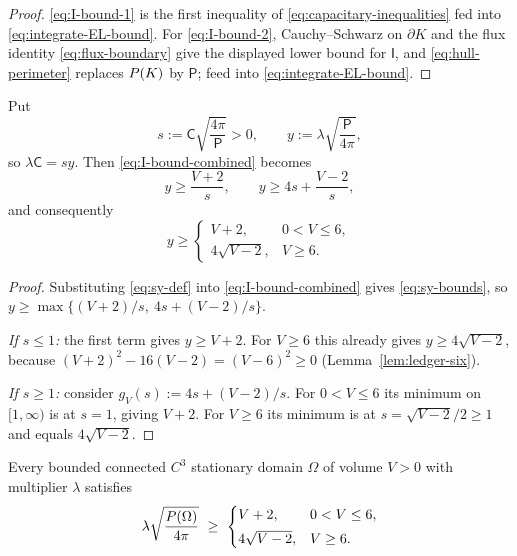 \begin{proof}
\eqref{eq:I-bound-1} is the first inequality of
\eqref{eq:capacitary-inequalities} fed into
\eqref{eq:integrate-EL-bound}.  For \eqref{eq:I-bound-2}, Cauchy--Schwarz on
$\partial K$ and the flux identity \eqref{eq:flux-boundary} give the displayed
lower bound for $\mathsf I$, and \eqref{eq:hull-perimeter} replaces $P(K)$
by $\mathsf P$; feed into \eqref{eq:integrate-EL-bound}.
\end{proof}

\begin{lemma}\label{lem:eliminate-capacity}
Put
\begin{equation}\label{eq:sy-def}
  s:=\mathsf C\sqrt{\frac{4\pi}{\mathsf P}}>0,
  \qquad
  y:=\lambda\sqrt{\frac{\mathsf P}{4\pi}},
\end{equation}
so $\lambda\mathsf C=sy$.  Then \eqref{eq:I-bound-combined} becomes
\begin{equation}\label{eq:sy-bounds}
  y\ge\frac{V+2}{s},
  \qquad
  y\ge4s+\frac{V-2}{s},
\end{equation}
and consequently
\begin{equation}\label{eq:y-lower}
  y\ge\begin{cases}V+2,&0<V\le6,\\[1mm]4\sqrt{V-2},&V\ge6 .\end{cases}
\end{equation}
\end{lemma}

\begin{proof}
Substituting \eqref{eq:sy-def} into \eqref{eq:I-bound-combined} gives
\eqref{eq:sy-bounds}, so
$y\ge\max\{(V+2)/s,\ 4s+(V-2)/s\}$.

\emph{If $s\le1$:} the first term gives $y\ge V+2$.  For $V\ge6$ this already
gives $y\ge4\sqrt{V-2}$, because
$(V+2)^2-16(V-2)=(V-6)^2\ge0$ (Lemma~\ref{lem:ledger-six}).

\emph{If $s\ge1$:} consider $g_V(s):=4s+(V-2)/s$.  For $0<V\le6$ its minimum
on $[1,\infty)$ is at $s=1$, giving $V+2$.  For $V\ge6$ its minimum is at
$s=\sqrt{V-2}/2\ge1$ and equals $4\sqrt{V-2}$.
\end{proof}

\begin{proposition}\label{prop:cap-estimate}
Every bounded connected $C^3$ stationary domain $\Omega$ of volume $V>0$ with
multiplier $\lambda$ satisfies
\begin{equation}\label{eq:cap-estimate}
  \lambda\sqrt{\frac{P(\Omega)}{4\pi}}
  \ \ge\
  \begin{cases}
    V+2,&0<V\le6,\\[1mm]
    4\sqrt{V-2},&V\ge6 .
  \end{cases}
\end{equation}
\end{proposition}

